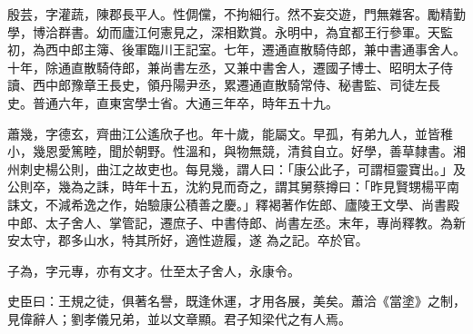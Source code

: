 \begin{pinyinscope}
 殷芸，字灌蔬，陳郡長平人。性倜儻，不拘細行。然不妄交遊，門無雜客。勵精勤學，博洽群書。幼而廬江何憲見之，深相歎賞。永明中，為宜都王行參軍。天監初，為西中郎主簿、後軍臨川王記室。七年，遷通直散騎侍郎，兼中書通事舍人。十年，除通直散騎侍郎，兼尚書左丞，又兼中書舍人，遷國子博士、昭明太子侍讀、西中郎豫章王長史，領丹陽尹丞，累遷通直散騎常侍、秘書監、司徒左長
 史。普通六年，直東宮學士省。大通三年卒，時年五十九。



 蕭幾，字德玄，齊曲江公遙欣子也。年十歲，能屬文。早孤，有弟九人，並皆稚小，幾恩愛篤睦，聞於朝野。性溫和，與物無競，清貧自立。好學，善草隸書。湘州刺史楊公則，曲江之故吏也。每見幾，謂人曰：「康公此子，可謂桓靈寶出。」及公則卒，幾為之誄，時年十五，沈約見而奇之，謂其舅蔡撙曰：「昨見賢甥楊平南誄文，不減希逸之作，始驗康公積善之慶。」釋褐著作佐郎、廬陵王文學、尚書殿中郎、太子舍人、掌管記，遷庶子、中書侍郎、尚書左丞。末年，專尚釋教。為新安太守，郡多山水，特其所好，適性遊履，遂
 為之記。卒於官。



 子為，字元專，亦有文才。仕至太子舍人，永康令。



 史臣曰：王規之徒，俱著名譽，既逢休運，才用各展，美矣。蕭洽《當塗》之制，見偉辭人；劉孝儀兄弟，並以文章顯。君子知梁代之有人焉。



\end{pinyinscope}